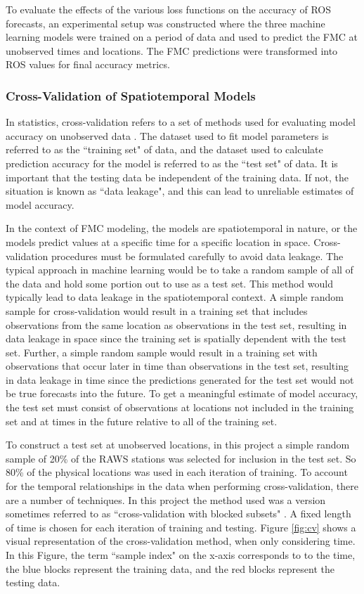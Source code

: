 \documentclass[11pt]{article}%
\begin{document}
To evaluate the effects of the various loss functions on the accuracy of ROS forecasts, an experimental setup was constructed where the three machine learning models were trained on a period of data and used to predict the FMC at unobserved times and locations. The FMC predictions were transformed into ROS values for final accuracy metrics. 

\subsubsection{Cross-Validation of Spatiotemporal Models}
\label{sec:cv}
\hfill

In statistics, cross-validation refers to a set of methods used for evaluating model accuracy on unobserved data \citep[Chap.\  7.10]{Hastie-2010-ESL}. The dataset used to fit model parameters is referred to as the ``training set" of data, and the dataset used to calculate prediction accuracy for the model is referred to as the ``test set" of data. It is important that the testing data be independent of the training data. If not, the situation is known as ``data leakage", and this can lead to unreliable estimates of model accuracy.

In the context of FMC modeling, the models are spatiotemporal in nature, or the models predict values at a specific time for a specific location in space. Cross-validation procedures must be formulated carefully to avoid data leakage. The typical approach in machine learning would be to take a random sample of all of the data and hold some portion out to use as a test set. This method would typically lead to data leakage in the spatiotemporal context. A simple random sample for cross-validation would result in a training set that includes observations from the same location as observations in the test set, resulting in data leakage in space since the training set is spatially dependent with the test set. Further, a simple random sample would result in a training set with observations that occur later in time than observations in the test set, resulting in data leakage in time since the predictions generated for the test set would not be true forecasts into the future. To get a meaningful estimate of model accuracy, the test set must consist of observations at locations not included in the training set and at times in the future relative to all of the training set. 

To construct a test set at unobserved locations, in this project a simple random sample of 20\% of the RAWS stations was selected for inclusion in the test set. So 80\% of the physical locations was used in each iteration of training. To account for the temporal relationships in the data when performing cross-validation, there are a number of techniques. In this project the method used was a version sometimes referred to as ``cross-validation with blocked subsets" \citep[p.\ 199]{Bergmeir-2012-OUC}. A fixed length of time is chosen for each iteration of training and testing. Figure \ref{fig:cv} shows a visual representation of the cross-validation method, when only considering time. In this Figure, the term ``sample index" on the x-axis corresponds to to the time, the blue blocks represent the training data, and the red blocks represent the testing data.
\end{document}
